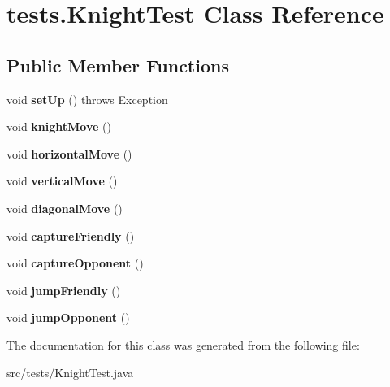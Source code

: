 \hypertarget{classtests_1_1_knight_test}{\section{tests.\-Knight\-Test Class Reference}
\label{classtests_1_1_knight_test}
}
\subsection*{Public Member Functions}
\begin{DoxyCompactItemize}
\item 
\hypertarget{classtests_1_1_knight_test_afc21f6bb2c50898bf3c3d3ae77344752}{void {\bfseries set\-Up} ()  throws Exception }\label{classtests_1_1_knight_test_afc21f6bb2c50898bf3c3d3ae77344752}

\item 
\hypertarget{classtests_1_1_knight_test_aae56788f63bdbcca2160db0ffa8ac345}{void {\bfseries knight\-Move} ()}\label{classtests_1_1_knight_test_aae56788f63bdbcca2160db0ffa8ac345}

\item 
\hypertarget{classtests_1_1_knight_test_a1cbbc10578f816892e1db40232a5c593}{void {\bfseries horizontal\-Move} ()}\label{classtests_1_1_knight_test_a1cbbc10578f816892e1db40232a5c593}

\item 
\hypertarget{classtests_1_1_knight_test_a2293f0c1c89e22b816231f573f9eff7c}{void {\bfseries vertical\-Move} ()}\label{classtests_1_1_knight_test_a2293f0c1c89e22b816231f573f9eff7c}

\item 
\hypertarget{classtests_1_1_knight_test_a9351a4b7fed2ecc5ad1a0a287a7b5366}{void {\bfseries diagonal\-Move} ()}\label{classtests_1_1_knight_test_a9351a4b7fed2ecc5ad1a0a287a7b5366}

\item 
\hypertarget{classtests_1_1_knight_test_ac90e59b248330794de2a8bd50152f7b5}{void {\bfseries capture\-Friendly} ()}\label{classtests_1_1_knight_test_ac90e59b248330794de2a8bd50152f7b5}

\item 
\hypertarget{classtests_1_1_knight_test_a5baa0f40f216230185e5c18beef82787}{void {\bfseries capture\-Opponent} ()}\label{classtests_1_1_knight_test_a5baa0f40f216230185e5c18beef82787}

\item 
\hypertarget{classtests_1_1_knight_test_a8eef748c954d221c16b0fca97ca2aeb6}{void {\bfseries jump\-Friendly} ()}\label{classtests_1_1_knight_test_a8eef748c954d221c16b0fca97ca2aeb6}

\item 
\hypertarget{classtests_1_1_knight_test_abe8f7e250d917d8b3e898e48e0cada72}{void {\bfseries jump\-Opponent} ()}\label{classtests_1_1_knight_test_abe8f7e250d917d8b3e898e48e0cada72}

\end{DoxyCompactItemize}


The documentation for this class was generated from the following file\-:\begin{DoxyCompactItemize}
\item 
src/tests/Knight\-Test.\-java\end{DoxyCompactItemize}
